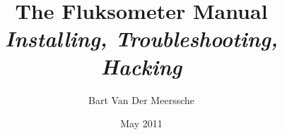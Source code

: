 


\title{
    The Fluksometer Manual\\
    \textit{Installing, Troubleshooting, Hacking}
}
\author{Bart Van Der Meerssche}
\date{May 2011}



\frontmatter

\maketitle

\tableofcontents



\mainmatter

%

%
%
%

\appendix


